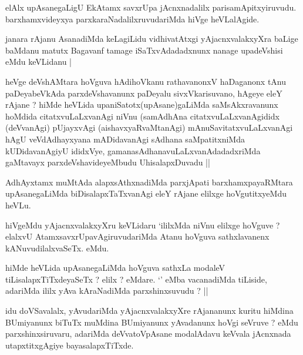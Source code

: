 \begin{artha}
elAlx upAsanegaLigU EkAtamx savxrUpa jAcnxnadalilx parisamApitxyiruvudu. barxhamxvideyxya parxkaraNadalilxruvudariMda hiVge heVLalAgide.
\end{artha}

\begin{artha}
janara rAjanu AsanadiMda keLagiLidu vidhivatAtxgi yAjacnxvalakxyXra baLige baMdanu matutx Bagavanf tamage iSaTxvAdadadxnunx nanage upadeVshisi eMdu keVLidanu |
\end{artha}


\begin{artha}
heVge deVshAMtara hoVguva hAdihoVkanu rathavanonxV haDaganonx tAnu paDeyabeVkAda parxdeVshavanunx paDeyalu sivxVkarisuvano, hAgeye eleY rAjane ? hiMde heVLida upaniSatotx(upAsane)gaLiMda saMsAkxravanunx hoMdida citatxvuLaLxvanAgi niVnu (samAdhAna citatxvuLaLxvanAgididx (deVvanAgi) pUjayxvAgi (aishavxyaRvaMtanAgi) mAnuSavitatxvuLaLxvanAgi hAgU veVdAdhayxyana mADidavanAgi sAdhana saMpatitxniMda kUDidavanAgiyU ididxVye, gamanasAdhanavuLaLxvanAdadadxriMda gaMtavayx parxdeVshavideyeMbudu UhisalapxDuvadu ||
\end{artha}

\begin{artha}
AdhAyxtamx muMtAda alapxsAthxnadiMda parxjApati barxhamxpayaRMtara upAsanegaLiMda biDisalapxTaTxvanAgi eleY rAjane elilxge hoVgutitxyeMdu heVLu.
\end{artha}

\begin{artha}
hiVgeMdu yAjacnxvalakxyXru keVLidaru `ililxMda niVnu elilxge hoVguve ? elalxvU AtamxsavxrUpavAgiruvudariMda Atanu hoVguva sathxlavanenx kANuvudilalxvaSeTx. eMdu.
\end{artha}


\begin{artha}
hiMde heVLida upAsanegaLiMda hoVguva sathxLa modaleV tiLisalapxTiTxdeyaSeTx ? elilx ? eMdare. `\stext' eMba vacanadiMda tiLiside, adariMda ililx yAva kAraNadiMda parxshinxsuvudu ? ||
\end{artha}


\begin{artha}
idu doVSavalalx, yAvudariMda yAjacnxvalakxyXre rAjananunx kuritu hiMdina BUmiyanunx biTuTx muMdina BUmiyanunx yAvadanunx hoVgi seVruve ? eMdu parxshinxsiruvaru, adariMda deVvatoVpAsane modalAdavu keVvala jAcnxnada utapxtitxgAgiye bayasalapxTiTxde.
\end{artha}

